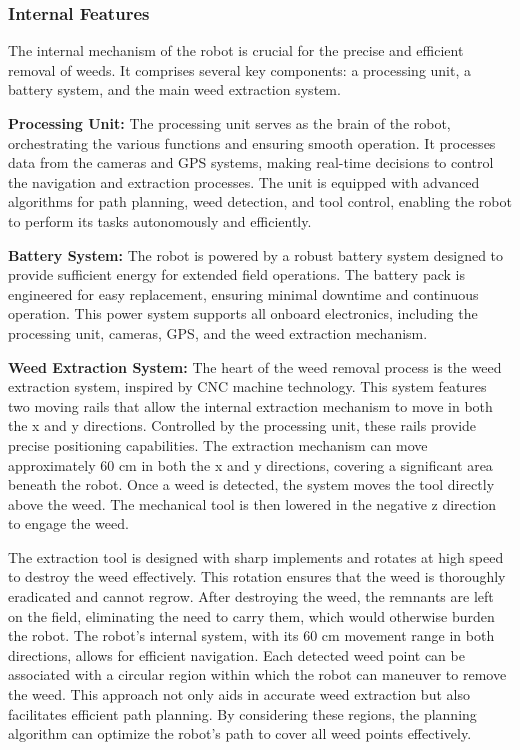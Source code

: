 \subsubsection{Internal Features}

The internal mechanism of the robot is crucial for the precise and efficient removal of weeds. It comprises several key components: a processing unit, a battery system, and the main weed extraction system.


\vspace*{6mm}


\textbf{Processing Unit: } The processing unit serves as the brain of the robot, orchestrating the various functions and ensuring smooth operation. It processes data from the cameras and GPS systems, making real-time decisions to control the navigation and extraction processes. The unit is equipped with advanced algorithms for path planning, weed detection, and tool control, enabling the robot to perform its tasks autonomously and efficiently.


\vspace*{6mm}

\textbf{Battery System: }
The robot is powered by a robust battery system designed to provide sufficient energy for extended field operations. The battery pack is engineered for easy replacement, ensuring minimal downtime and continuous operation. This power system supports all onboard electronics, including the processing unit, cameras, GPS, and the weed extraction mechanism.


\vspace*{6mm}


\textbf{Weed Extraction System: }
The heart of the weed removal process is the weed extraction system, inspired by CNC machine technology. This system features two moving rails that allow the internal extraction mechanism to move in both the x and y directions. Controlled by the processing unit, these rails provide precise positioning capabilities. The extraction mechanism can move approximately 60 cm in both the x and y directions, covering a significant area beneath the robot. Once a weed is detected, the system moves the tool directly above the weed. The mechanical tool is then lowered in the negative z direction to engage the weed.

\vspace*{6mm}

The extraction tool is designed with sharp implements and rotates at high speed to destroy the weed effectively. This rotation ensures that the weed is thoroughly eradicated and cannot regrow. After destroying the weed, the remnants are left on the field, eliminating the need to carry them, which would otherwise burden the robot. The robot’s internal system, with its 60 cm movement range in both directions, allows for efficient navigation. Each detected weed point can be associated with a circular region within which the robot can maneuver to remove the weed. This approach not only aids in accurate weed extraction but also facilitates efficient path planning. By considering these regions, the planning algorithm can optimize the robot's path to cover all weed points effectively.

